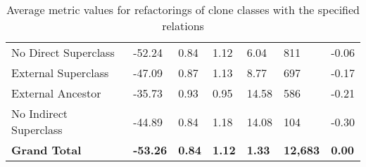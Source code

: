 \begin{appendices}
\begin{table}[]
{\begin{tabular}{@{}lllllll@{}}
\hspace{10pt} No Direct Superclass & -52.24 & 0.84 & 1.12 & 6.04 & 811 & -0.06 \\
\hspace{10pt} External Superclass & -47.09 & 0.87 & 1.13 & 8.77 & 697 & -0.17 \\
\hspace{10pt} External Ancestor & -35.73 & 0.93 & 0.95 & 14.58 & 586 & -0.21 \\
\hspace{10pt} No Indirect Superclass & -44.89 & 0.84 & 1.18 & 14.08 & 104 & -0.30 \\ \midrule
\textbf{Grand Total} & \textbf{-53.26} & \textbf{0.84} & \textbf{1.12} & \textbf{1.33} & \textbf{12,683} & \textbf{0.00} \\ \bottomrule
\end{tabular}%
}
\caption{Average metric values for refactorings of clone classes with the specified relations}
\label{tab:full-relation}
\end{table}

\end{appendices}
